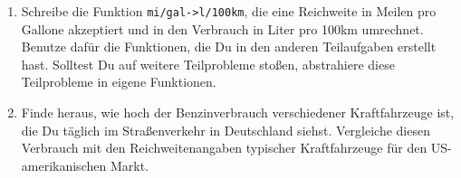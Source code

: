\begin{aufgabe}
\begin{enumerate}
  \item Schreibe die Funktion
    \texttt{mi/gal->l/100km}, die eine Reichweite in Meilen pro
    Gallone akzeptiert und in den Verbrauch in Liter pro 100km
    umrechnet.  Benutze dafür die Funktionen, die Du in den
    anderen Teilaufgaben erstellt hast.  Solltest Du auf weitere
    Teilprobleme stoßen, abstrahiere diese Teilprobleme in eigene
    Funktionen.

  \item Finde heraus, wie hoch der Benzinverbrauch
    verschiedener Kraftfahrzeuge ist, die Du täglich im
    Straßenverkehr in Deutschland siehst.  Vergleiche diesen
    Verbrauch mit den Reichweitenangaben typischer Kraftfahrzeuge für
    den US-amerikanischen Markt.
  \end{enumerate}

\end{aufgabe}



